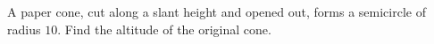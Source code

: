 A paper cone, cut along a slant height and opened out, forms a semicircle of radius $10$. Find the altitude of the original cone.
